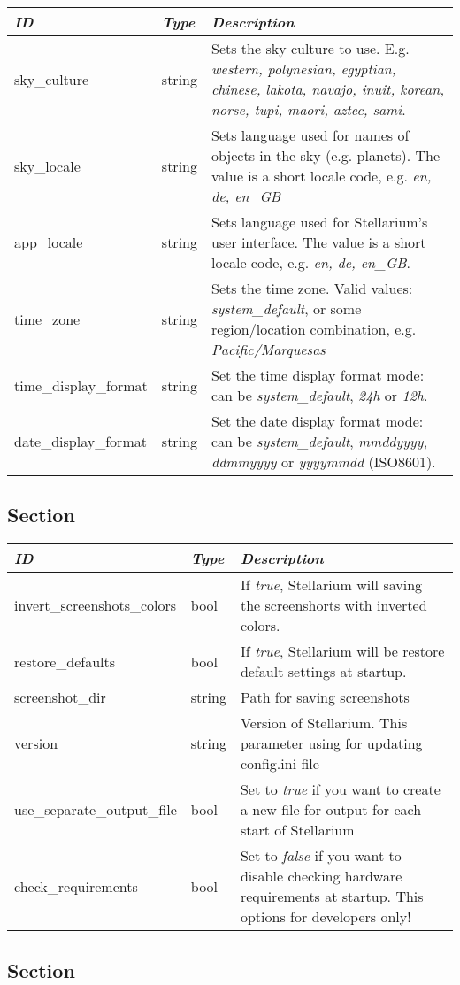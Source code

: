 \begin{longtabu} to \textwidth {l|l|X}
\toprule
\emph{ID} & \emph{Type} & \emph{Description}\tabularnewline
\midrule
sky\_culture & string & Sets the sky culture to use. E.g.
\emph{western, polynesian, egyptian, chinese, lakota, navajo, inuit,
korean, norse, tupi, maori, aztec, sami}.\tabularnewline
\midrule
sky\_locale & string & Sets language used for names of
objects in the sky (e.g. planets). The value is a short locale code,
e.g. \emph{en, de, en\_GB}\tabularnewline
\midrule
app\_locale & string & Sets language used for Stellarium's
user interface. The value is a short locale code, e.g. \emph{en, de,
en\_GB}.\tabularnewline
\midrule
time\_zone & string & Sets the time zone. Valid values:
\emph{system\_default}, or some region/location combination, e.g.
\emph{Pacific/Marquesas}\tabularnewline
\midrule
time\_display\_format & string & Set the time display format
mode: can be \emph{system\_default}, \emph{24h} or
\emph{12h}.\tabularnewline
\midrule
date\_display\_format & string & Set the date display format
mode: can be \emph{system\_default}, \emph{mmddyyyy}, \emph{ddmmyyyy} or
\emph{yyyymmdd} (ISO8601).\tabularnewline
\bottomrule
\end{longtabu}

\subsection{Section }\label{section-main}

\begin{longtabu} to \textwidth {l|l|X}
\toprule
\emph{ID} & \emph{Type} & \emph{Description}\tabularnewline
\midrule
invert\_screenshots\_colors & bool & If \emph{true},
Stellarium will saving the screenshorts with inverted
colors.\tabularnewline
\midrule
restore\_defaults & bool & If \emph{true}, Stellarium will be
restore default settings at startup.\tabularnewline
\midrule
screenshot\_dir & string & Path for saving
screenshots\tabularnewline
\midrule
version & string & Version of Stellarium. This parameter
using for updating config.ini file\tabularnewline
\midrule
use\_separate\_output\_file & bool & Set to \emph{true} if you
want to create a new file for output for each start of
Stellarium\tabularnewline
\midrule
check\_requirements & bool & Set to \emph{false} if you want
to disable checking hardware requirements at startup. This options for
developers only!\tabularnewline
\bottomrule
\end{longtabu}

\subsection{Section }\label{section-navigation}


